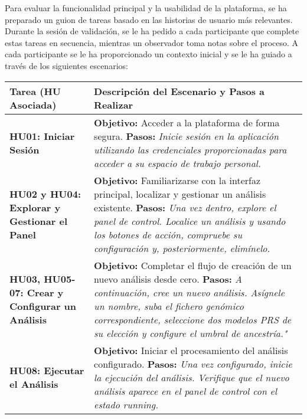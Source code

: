Para evaluar la funcionalidad principal y la usabilidad de la plataforma, se ha preparado un guion de tareas basado en las historias de usuario más relevantes. Durante la sesión de validación, se le ha pedido a cada participante que complete estas tareas en secuencia, mientras un observador toma notas sobre el proceso. A cada participante se le ha proporcionado un contexto inicial y se le ha guiado a través de los siguientes escenarios:

\renewcommand{\arraystretch}{1.8} %
\begin{table}[H]
    \centering
    \small
    \begin{tabularx}{\textwidth}{XX}
        \toprule
        \textbf{Tarea (HU Asociada)} & \textbf{Descripción del Escenario y Pasos a Realizar} \\
         \toprule
        \textbf{HU01: Iniciar Sesión} & 
        \textbf{Objetivo:} Acceder a la plataforma de forma segura. \newline
        \textbf{Pasos: }\textit{Inicie sesión en la aplicación utilizando las credenciales proporcionadas para acceder a su espacio de trabajo personal.} \\

        \textbf{HU02 y HU04: Explorar y Gestionar el Panel} & 
        \textbf{Objetivo:} Familiarizarse con la interfaz principal, localizar y gestionar un análisis existente. \newline
        \textbf{Pasos: }\textit{Una vez dentro, explore el panel de control. Localice un análisis y usando los botones de acción, compruebe su configuración y, posteriormente, elimínelo.} \\

        \textbf{HU03, HU05-07: Crear y Configurar un Análisis} & 
        \textbf{Objetivo:} Completar el flujo de creación de un nuevo análisis desde cero. \newline
        \textbf{Pasos: }\textit{A continuación, cree un nuevo análisis. Asígnele un nombre, suba el fichero genómico correspondiente, seleccione dos modelos PRS de su elección y configure el umbral de ancestría."} \\

        \textbf{HU08: Ejecutar el Análisis} & 
        \textbf{Objetivo:} Iniciar el procesamiento del análisis configurado. \newline
        \textbf{Pasos: }\textit{Una vez configurado, inicie la ejecución del análisis. Verifique que el nuevo análisis aparece en el panel de control con el estado \textit{running}.} \\


\end{tabularx}
\end{table}
